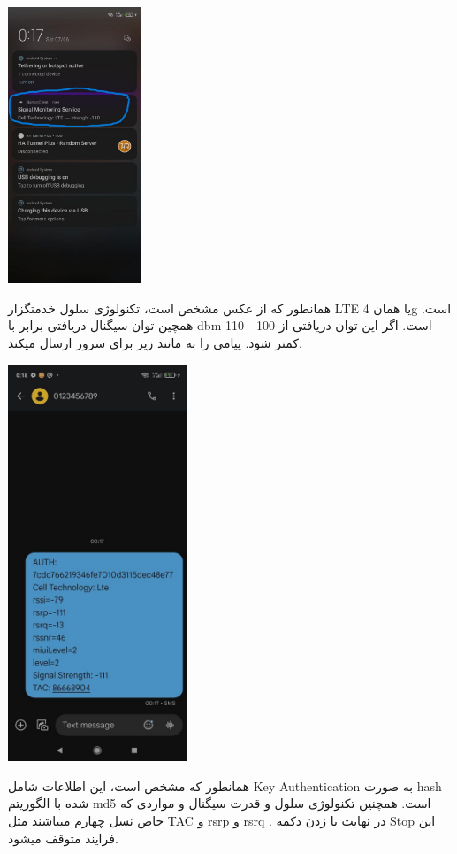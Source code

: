 \documentclass{article}
\begin{document}
\includegraphics[width=0.3\textwidth]{notif.jpg}\par\vspace{1cm}
همانطور که از عکس مشخص است، تکنولوژی سلول خدمتگزار LTE یا همان 4g است. همچین توان سیگنال دریافتی برابر با dbm 110- است.  
اگر این توان دریافتی از 100- کمتر شود. پیامی را به مانند زیر برای سرور ارسال میکند.
\singlespacing

\includegraphics[width=0.4\textwidth]{message.jpg}\par\vspace{1cm}
همانطور که مشخص است، این اطلاعات شامل Key Authentication به صورت hash شده با الگوریتم md5 است. همچنین تکنولوژی سلول و قدرت سیگنال و مواردی که خاص نسل چهارم میباشند مثل TAC و rsrp و rsrq .
در نهایت با زدن دکمه Stop این فرایند متوقف میشود.
\singlespacing
\end{document}
